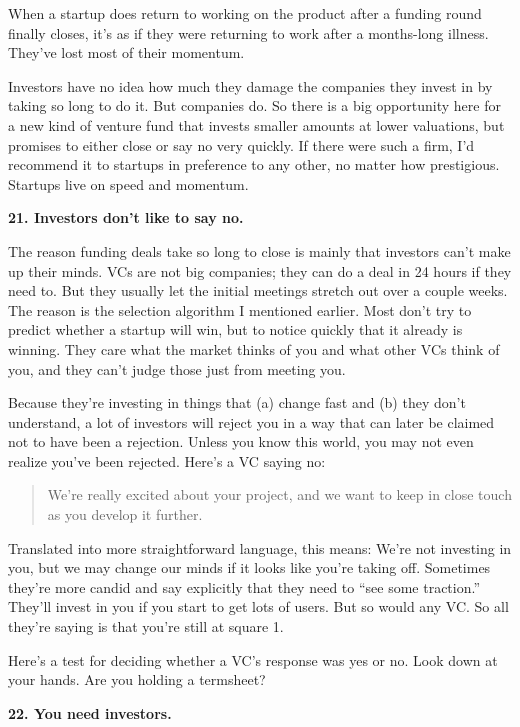 \documentclass[12pt]{book}
\begin{document}
When a startup does return to working on the product after a funding
round finally closes, it's as if they were returning to work after a
months-long illness. They've lost most of their momentum.

Investors have no idea how much they damage the companies they invest in
by taking so long to do it. But companies do. So there is a big
opportunity here for a new kind of venture fund that invests smaller
amounts at lower valuations, but promises to either close or say no very
quickly. If there were such a firm, I'd recommend it to startups in
preference to any other, no matter how prestigious. Startups live on
speed and momentum.

\textbf{21. Investors don't like to say no.}

The reason funding deals take so long to close is mainly that investors
can't make up their minds. VCs are not big companies; they can do a deal
in 24 hours if they need to. But they usually let the initial meetings
stretch out over a couple weeks. The reason is the selection algorithm I
mentioned earlier. Most don't try to predict whether a startup will win,
but to notice quickly that it already is winning. They care what the
market thinks of you and what other VCs think of you, and they can't
judge those just from meeting you.

Because they're investing in things that (a) change fast and (b) they
don't understand, a lot of investors will reject you in a way that can
later be claimed not to have been a rejection. Unless you know this
world, you may not even realize you've been rejected. Here's a VC saying
no:

\begin{quote}
We're really excited about your project, and we want to keep in close
touch as you develop it further.
\end{quote}

Translated into more straightforward language, this means: We're not
investing in you, but we may change our minds if it looks like you're
taking off. Sometimes they're more candid and say explicitly that they
need to ``see some traction.'' They'll invest in you if you start to get
lots of users. But so would any VC. So all they're saying is that you're
still at square 1.

Here's a test for deciding whether a VC's response was yes or no. Look
down at your hands. Are you holding a termsheet?

\textbf{22. You need investors.}
\end{document}
